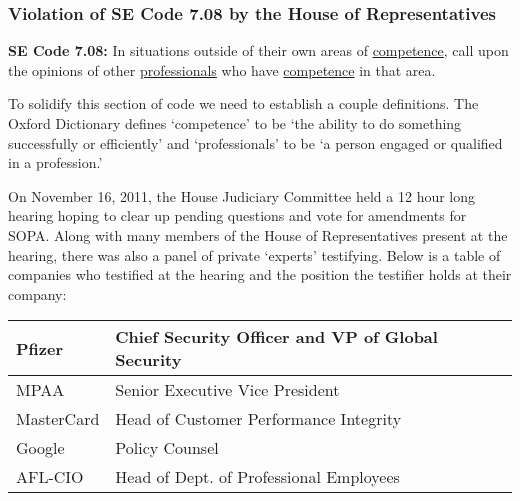 \documentclass[11pt]{article}
\begin{document}
\begin{multicols}{2}
   \subsubsection{Violation of SE Code 7.08 by the House of Representatives}


\begin{framed}
\noindent
  \textbf{SE Code 7.08:}
  \newline
  In situations outside of their own areas of \underline{competence}, call upon the opinions of other \underline{professionals} who have \underline{competence} in that area.\cite[7.08]{se-code}
\end{framed}

To solidify this section of code we need to establish a couple definitions. The Oxford Dictionary defines `competence' to be `the ability to do something successfully or efficiently' and `professionals' to be `a person engaged or qualified in a profession.'\cite{def-competence}\cite{def-profession}

On November 16, 2011, the House Judiciary Committee held a 12 hour long hearing hoping to clear up pending questions and vote for amendments for SOPA.\cite{sopa-hearings-atlantic} Along with many members of the House of Representatives present at the hearing, there was also a panel of private `experts' testifying. Below is a table of companies who testified at the hearing and the position the testifier holds at their company:\cite{sopa-hearing-primary}

\begin{center}
  \begin{tabular}{|m{2cm}|m{4.5cm}|}
    \hline
    Pfizer & Chief Security Officer and VP of Global Security \\ \hline
    MPAA & Senior Executive Vice President \\ \hline
    MasterCard & Head of Customer Performance Integrity \\ \hline
    Google & Policy Counsel \\ \hline
    AFL-CIO & Head of Dept. of Professional Employees \\ \hline
  \end{tabular}
\end{center}


\end{multicols}
\end{document}
